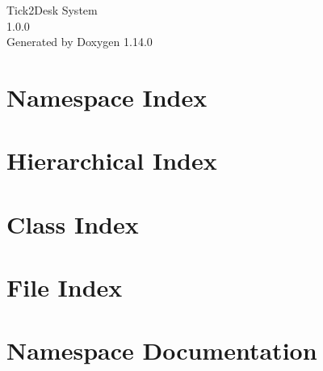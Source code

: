 \documentclass[twoside]{book}
\newcommand{\+}{\discretionary{\mbox{\scriptsize$\hookleftarrow$}}{}{}}
\newcommand{\clearemptydoublepage}{%
    \newpage{\pagestyle{empty}\cleardoublepage}%
  }
\begin{document}
  \raggedbottom
    \hypersetup{pageanchor=false,
                bookmarksnumbered=true,
                pdfencoding=unicode
               }
  \begin{titlepage}
  \vspace*{7cm}
  \begin{center}%
  {\Large Tick2\+Desk System}\\
  [1ex]\large 1.\+0.\+0 \\
  \vspace*{1cm}
  {\large Generated by Doxygen 1.14.0}\\
  \end{center}
  \end{titlepage}
  \clearemptydoublepage
  \tableofcontents
  \clearemptydoublepage
  \hypersetup{pageanchor=true}
\chapter{Namespace Index}

\chapter{Hierarchical Index}

\chapter{Class Index}

\chapter{File Index}

\chapter{Namespace Documentation}







\end{document}
